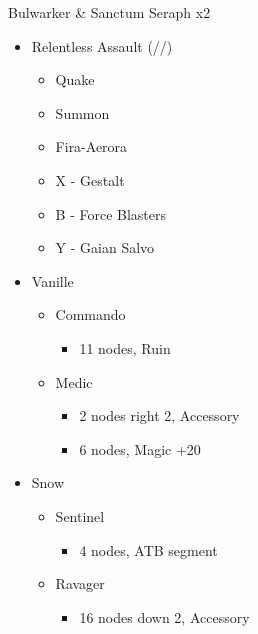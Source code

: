\begin{multicols}{2}
\begin{battle}{Bulwarker \& Sanctum Seraph x2}
\begin{itemize}
    \item [2] Relentless Assault (\rav/\rav/\com)
    \begin{itemize}
        \item Quake
        \item Summon
        \item Fira-Aerora
        \item X - Gestalt
        \item B - Force Blasters
        \item Y - Gaian Salvo
    \end{itemize}
\end{itemize}
\end{battle}
\vfill
\begin{menu}
\begin{itemize}
    \crystarium
    \begin{itemize}
        \item Vanille
        \begin{itemize}
            \item Commando
            \begin{itemize}
                \item 11 nodes, Ruin
            \end{itemize}
            \item Medic
            \begin{itemize}
                \item 2 nodes right 2, Accessory
                \item 6 nodes, Magic +20
            \end{itemize}
        \end{itemize}
        \item Snow
        \begin{itemize}
            \item Sentinel
            \begin{itemize}
                \item 4 nodes, ATB segment
            \end{itemize}
            \item Ravager
            \begin{itemize}
                \item 16 nodes down 2, Accessory
            \end{itemize}

\end{itemize}
\end{itemize}
\end{itemize}
\end{menu}
\end{multicols}
